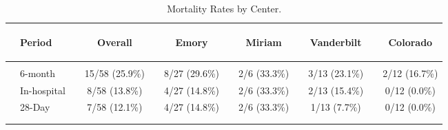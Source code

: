 \documentclass[dvips,10pt]{article}
\begin{document}
\begin{table}[t]
\caption
{ Mortality Rates by Center. }
\begin{center}
\begin{tabular}{ @{}l@{}
@{}l@{}@{}p{1.5em}@{}@{}c@{}@{}p{1.5em}@{}@{}c@{}@{}p{1.5em}@{}@{}c@{}@{}p{1.5em}@{}@{}c@{}@{}p{1.5em}@{}@{}c@{}
}
\hline

& \parbox{6em}{\begin{center}Period\end{center}} && \parbox{6em}{\begin{center}Overall\end{center}} && \parbox{6em}{\begin{center}Emory\end{center}} && \parbox{6em}{\begin{center}Miriam\end{center}} && \parbox{6em}{\begin{center}Vanderbilt\end{center}} && \parbox{6em}{\begin{center}Colorado\end{center}} \\

\hline

\\
& 6-month && 15/58 (25.9\%) && 8/27 (29.6\%) && 2/6 (33.3\%) && 3/13 (23.1\%) && 2/12 (16.7\%) \\
& In-hospital && 8/58 (13.8\%) && 4/27 (14.8\%) && 2/6 (33.3\%) && 2/13 (15.4\%) && 0/12 (0.0\%) \\
& 28-Day && 7/58 (12.1\%) && 4/27 (14.8\%) && 2/6 (33.3\%) && 1/13 (7.7\%) && 0/12 (0.0\%) \\
\\
\hline \\

\end{tabular}

\end{center}
 \end{table}
\clearpage

\begin{figure}
\end{figure}
\clearpage
\end{document}
